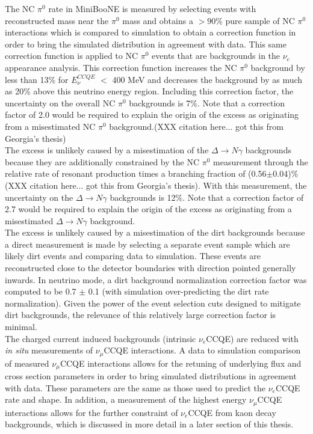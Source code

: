 The NC $\pi^0$ rate in MiniBooNE is measured by selecting events with reconstructed mass near the $\pi^0$ mass and obtains a $>90$\% pure sample of NC $\pi^0$ interactions which is compared to simulation to obtain a correction function in order to bring the simulated distribution in agreement with data. This same correction function is applied to NC $\pi^0$ events that are backgrounds in the $\nu_e$ appearance analysis. This correction function increases the NC $\pi^0$ background by less than 13\% for $E_\nu^{CCQE}$ $<$ 400 MeV and decreases the background by as much as 20\% above this neutrino energy region. Including this correction factor, the uncertainty on the overall NC $\pi^0$ backgrounds is 7\%. Note that a correction factor of 2.0 would be required to explain the origin of the excess as originating from a misestimated NC $\pi^0$ background.(XXX citation here... got this from Georgia's thesis)\\

The excess is unlikely caused by a misestimation of the $\Delta\rightarrow N\gamma$ backgrounds because they are additionally constrained by the NC $\pi^0$ measurement through the relative rate of resonant production times a branching fraction of (0.56$\pm$0.04)\% (XXX citation here... got this from Georgia's thesis). With this measurement, the uncertainty on the $\Delta\rightarrow N\gamma$ backgrounds is 12\%. Note that a correction factor of 2.7 would be required to explain the origin of the excess as originating from a misestimated $\Delta \rightarrow N\gamma$ background.\\

The excess is unlikely caused by a misestimation of the dirt backgrounds because a direct measurement is made by selecting a separate event sample which are likely dirt events and comparing data to simulation. These events are reconstructed close to the detector boundaries with direction pointed generally inwards. In neutrino mode, a dirt background normalization correction factor was computed to be 0.7 $\pm$ 0.1 (with simulation over-predicting the dirt rate normalization). Given the power of the event selection cuts designed to mitigate dirt backgrounds, the relevance of this relatively large correction factor is minimal.\\

The charged current induced backgrounds (intrinsic $\nu_e$CCQE) are reduced with \textit{in situ} measurements of $\nu_\mu$CCQE interactions. A data to simulation comparison of measured $\nu_\mu$CCQE interactions allows for the retuning of underlying flux and cross section parameters in order to bring simulated distributions in agreement with data. These parameters are the same as those used to predict the $\nu_e$CCQE rate and shape. In addition, a measurement of the highest energy $\nu_\mu$CCQE interactions allows for the further constraint of $\nu_e$CCQE from kaon decay backgrounds, which is discussed in more detail in a later section of this thesis.\\

